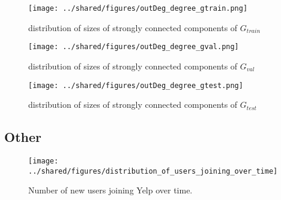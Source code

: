 \documentclass[letterpaper, 10 pt, conference]{ieeeconf}  %
\begin{document}
\begin{figure}[h!]
\centering
\texttt{[image: ../shared/figures/outDeg\_degree\_gtrain.png]}
\caption{distribution of sizes of strongly connected components of $G_{train}$}
\label{fig:degree_distribution_g_train}
\end{figure}
\begin{figure}[h!]
\centering
\texttt{[image: ../shared/figures/outDeg\_degree\_gval.png]}
\caption{distribution of sizes of strongly connected components of $G_{val}$}
\label{fig:degree_distribution_g_val}
\end{figure}
\begin{figure}[h!]
\centering
\texttt{[image: ../shared/figures/outDeg\_degree\_gtest.png]}
\caption{distribution of sizes of strongly connected components of $G_{test}$}
\label{fig:degree_distribution_g_test}
\end{figure}


\subsection{Other}


\begin{figure}[h!]
\centering
\texttt{[image: ../shared/figures/distribution\_of\_users\_joining\_over\_time]}
\caption{Number of new users joining Yelp over time.}
\label{fig:users_join_over_time}
\end{figure}
\end{document}
